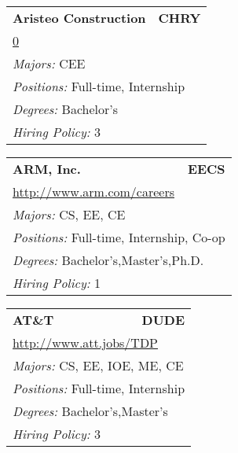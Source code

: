 \documentclass[twoside]{article}
\begin{document}
\begin{center}
\begin{multicols}{3}
\begin{FlushLeft}
\begin{minipage}{\columnwidth}
\end{minipage}
 
\begin{minipage}{\columnwidth}\begin{tabularx}{.95\columnwidth}{Xr}
                 {\Large\bf Aristeo Construction} & {\Large\bf CHRY}\\
    \multicolumn{2}{p{.95\columnwidth}}{\url{0}}\\
    \multicolumn{2}{p{.95\columnwidth}}{\emph{Majors:} CEE}\\
    \multicolumn{2}{p{.95\columnwidth}}{\emph{Positions:} Full-time, Internship}\\
    \multicolumn{2}{p{.95\columnwidth}}{\emph{Degrees:} Bachelor's}\\
    \multicolumn{2}{p{.95\columnwidth}}{\emph{Hiring Policy:} 3}\\
    \end{tabularx}
    
\end{minipage}
 
\begin{minipage}{\columnwidth}\begin{tabularx}{.95\columnwidth}{Xr}
                 {\Large\bf ARM, Inc.} & {\Large\bf EECS}\\
    \multicolumn{2}{p{.95\columnwidth}}{\url{http://www.arm.com/careers}}\\
    \multicolumn{2}{p{.95\columnwidth}}{\emph{Majors:} CS, EE, CE}\\
    \multicolumn{2}{p{.95\columnwidth}}{\emph{Positions:} Full-time, Internship, Co-op}\\
    \multicolumn{2}{p{.95\columnwidth}}{\emph{Degrees:} Bachelor's,Master's,Ph.D.}\\
    \multicolumn{2}{p{.95\columnwidth}}{\emph{Hiring Policy:} 1}\\
    \end{tabularx}
    
\end{minipage}
 
\begin{minipage}{\columnwidth}\begin{tabularx}{.95\columnwidth}{Xr}
                 {\Large\bf AT\&T} & {\Large\bf DUDE}\\
    \multicolumn{2}{p{.95\columnwidth}}{\url{http://www.att.jobs/TDP}}\\
    \multicolumn{2}{p{.95\columnwidth}}{\emph{Majors:} CS, EE, IOE, ME, CE}\\
    \multicolumn{2}{p{.95\columnwidth}}{\emph{Positions:} Full-time, Internship}\\
    \multicolumn{2}{p{.95\columnwidth}}{\emph{Degrees:} Bachelor's,Master's}\\
    \multicolumn{2}{p{.95\columnwidth}}{\emph{Hiring Policy:} 3}\\
    \end{tabularx}
    

\end{minipage}
\end{FlushLeft}
\end{multicols}
\end{center}
\end{document}
